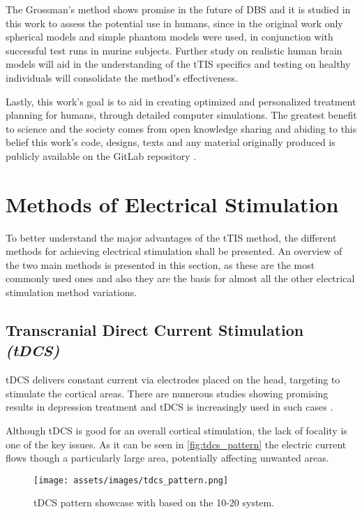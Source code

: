 The Grossman's method shows promise in the future of \gls{DBS} and it is studied in this work to assess the potential use in humans, since in the original work \cite{Grossman2017} only spherical models and simple phantom models were used, in conjunction with successful test runs in murine subjects. Further study on realistic human brain models will aid in the understanding of the \gls{tTIS} specifics and testing on healthy individuals will consolidate the method's effectiveness.

Lastly, this work's goal is to aid in creating optimized and personalized treatment planning for humans, through detailed computer simulations. The greatest benefit to science and the society comes from open knowledge sharing and abiding to this belief this work's code, designs, texts and any material originally produced is publicly available on the GitLab repository \cite{thesis_repo}.

\section{Methods of Electrical Stimulation}

To better understand the major advantages of the \gls{tTIS} method, the different methods for achieving electrical stimulation shall be presented. An overview of the two main methods is presented in this section, as these are the most commonly used ones and also they are the basis for almost all the other electrical stimulation method variations.

\subsection{Transcranial Direct Current Stimulation \textit{(tDCS)}}

\gls{tDCS} delivers constant current via electrodes placed on the head, targeting to stimulate the cortical areas. There are numerous studies showing promising results in depression treatment \cite{Moffa2020,Brunoni2016} and \gls{tDCS} is increasingly used in such cases \cite{Nitsche2008}.

Although \gls{tDCS} is good for an overall cortical stimulation, the lack of focality is one of the key issues. As it can be seen in \autoref{fig:tdcs_pattern} the electric current flows though a particularly large area, potentially affecting unwanted areas.

\begin{figure}[H]
    \centering
    \texttt{[image: assets/images/tdcs\_pattern.png]}
    \caption{\gls{tDCS} pattern showcase with  based on the 10-20 system.}
    \label{fig:tdcs_pattern}
\end{figure}

